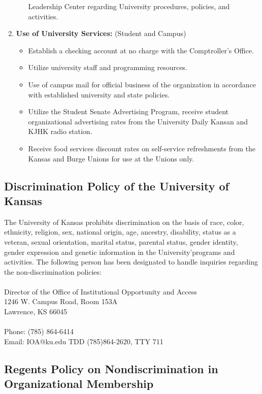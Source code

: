 \begin{enumerate}
\begin{itemize}
          Leadership Center regarding University procedures, policies, and
          activities.
  \end{itemize}
  \item \textbf{Use of University Services:} (Student and Campus)
  \begin{itemize}
    \item Establish a checking account at no charge with the Comptroller's
          Office.
    \item Utilize university staff and programming resources.
    \item Use of campus mail for official business of the organization in
          accordance with established university and state policies.
    \item Utilize the Student Senate Advertising Program, receive student
          organizational advertising rates from the University Daily Kansan and
          KJHK radio station.
    \item Receive food services discount rates on self-service refreshments from
          the Kansas and Burge Unions for use at the Unions only.
  \end{itemize}
\end{enumerate}


\subsection{Discrimination Policy of the University of Kansas}

The University of Kansas prohibits discrimination on the basis of race, color,
ethnicity, religion, sex, national origin, age, ancestry, disability, status as
a veteran, sexual orientation, marital status, parental status, gender identity,
gender expression and genetic information in the University’\s programs and
activities. The following person has been designated to handle inquiries
regarding the non-discrimination policies:
\\
\\
Director of the Office of Institutional Opportunity and Access\\
1246 W. Campus Road, Room 153A\\
Lawrence, KS 66045\\
\\
Phone: (785) 864-6414\\
Email: IOA@ku.edu
TDD (785)864-2620, TTY 711

\subsection{Regents Policy on Nondiscrimination in Organizational Membership}

